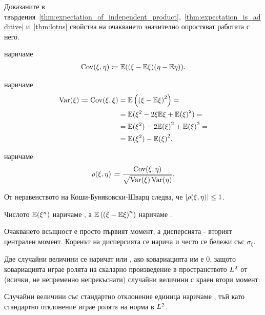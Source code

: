 \documentclass[numbers=endperiod, bibliography=totocnumbered]{scrartcl}
\begin{document}
Доказаните в твърдения~\ref{thm:expectation_of_independent_product},~\ref{thm:expectation_is_additive} и~\ref{thm:lotus} свойства на очакването значително опростяват работата с него.

\begin{definition}
   наричаме
  \begin{align*}
    \operatorname{Cov}(\xi, \eta)
    \coloneqq
    \mathbb{E}((\xi - \mathbb{E} \xi) (\eta - \mathbb{E} \eta)).
  \end{align*}

   наричаме
  \begin{align*}
    \operatorname{Var}(\xi)
    \coloneqq
    \operatorname{Cov}(\xi, \xi)
    &=
    \mathbb{E} \left({(\xi - \mathbb{E} \xi)}^2 \right)
    = \\ &=
    \mathbb{E}(\xi^2 - 2 \xi \mathbb{E} \xi + {\mathbb{E}(\xi)}^2)
    = \\ &=
    \mathbb{E}(\xi^2) - 2 {\mathbb{E}(\xi)}^2 + {\mathbb{E}(\xi)}^2
    = \\ &=
    \mathbb{E}(\xi^2) - {\mathbb{E}(\xi)}^2.
  \end{align*}

   наричаме
  \begin{align*}
    \operatorname{\rho}(\xi, \eta)
    \coloneqq
    \frac {\operatorname{Cov}(\xi, \eta)} {\sqrt{\operatorname{Var}(\xi) \operatorname{Var}(\eta)}}.
  \end{align*}

  От неравенството на Коши-Буняковски-Шварц следва, че \( \left\vert \operatorname{\rho}(\xi, \eta) \right\vert \leq 1 \).

  Числото \( \mathbb{E}(\xi^n) \) наричаме , а \( \mathbb{E} \left( {(\xi - \mathbb{E} \xi)}^n \right) \) наричаме .

  Очакването всъщност е просто първият момент, а дисперсията - вторият централен момент. Коренът на дисперсията се нарича  и често се бележи със \( \sigma_\xi \).

  Две случайни величини се наричат  или , ако ковариацията им е \( 0 \), защото ковариацията играе ролята на скаларно произведение в пространството \( L^2 \) от (всички, не непременно непрекъснати) случайни величини с краен втори момент.

  Случайни величини със стандартно отклонение единица наричаме , тъй като стандартно отклонение играе ролята на норма в \( L^2 \).
\end{definition}
\end{document}
